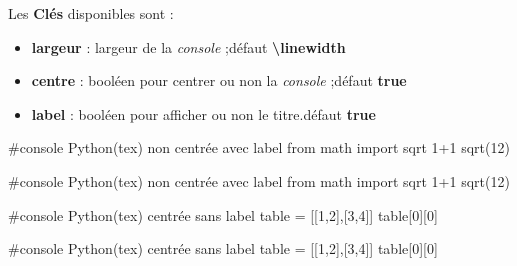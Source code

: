 \documentclass{article}
\newcommand\Cle[1]{{\bfseries\sffamily\textlangle #1\textrangle}}
\begin{document}
\smallskip

\begin{codecles}
Les \Cle{Clés} disponibles sont :

\begin{itemize}
	\item \Cle{largeur} : largeur de la \textit{console} ;\hfill{}défaut \Cle{\textbackslash linewidth}
	\item \Cle{centre} : booléen pour centrer ou non la \textit{console} ;\hfill{}défaut \Cle{true}
	\item \Cle{label} : booléen pour afficher ou non le titre.\hfill{}défaut \Cle{true}
\end{itemize}
\end{codecles}

\medskip

\begin{codetex}
\begin{envconsolepythontex}[largeur=14cm,centre=false]
	#console Python(tex) non centrée avec label
	from math import sqrt
	1+1
	sqrt(12)
\end{envconsolepythontex}
\end{codetex}

\smallskip

\begin{codesortie}
\smallskip
\begin{envconsolepythontex}[largeur=14cm,centre=false]
	#console Python(tex) non centrée avec label
	from math import sqrt
	1+1
	sqrt(12)
\end{envconsolepythontex}
\end{codesortie}

\medskip

\begin{codetex}
\begin{envconsolepythontex}[largeur=14cm,label=false]
	#console Python(tex) centrée sans label
	table = [[1,2],[3,4]]
	table[0][0]
\end{envconsolepythontex}
\end{codetex}

\smallskip

\begin{codesortie}
\smallskip
\begin{envconsolepythontex}[largeur=14cm,label=false]
	#console Python(tex) centrée sans label
	table = [[1,2],[3,4]]
	table[0][0]
\end{envconsolepythontex}
\end{codesortie}
\end{document}
